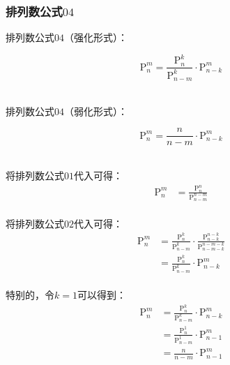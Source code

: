 \documentclass[UTF8]{ctexart}
\begin{document}
\subsubsection{排列数公式$04$}
    排列数公式$04$（强化形式）：
    \begin{large}
        \begin{equation*}
            \mathrm{P}_n^m=\frac{\mathrm{P}_n^k}{\mathrm{P}_{n-m}^k}\cdot\mathrm{P}_{n-k}^{m}
        \end{equation*}
    \end{large}\\
    排列数公式$04$（弱化形式）：
    \begin{large}
        \begin{equation*}
            \mathrm{P}_n^m=\frac{n}{n-m}\cdot\mathrm{P}_{n-k}^{m}
        \end{equation*}
    \end{large}\\
    将排列数公式$01$代入可得：
    \setcounter{equation}{0}
    \begin{align}
        \mathrm{P}_n^m&=\frac{\mathrm{P}_n^n}{\mathrm{P}_{n-m}^{n-m}}
    \end{align}\\
    将排列数公式$02$代入可得：
    \begin{align}
        \mathrm{P}_n^m
        &=\frac{\mathrm{P}_n^k}{\mathrm{P}_{n-m}^k}\cdot\frac{\mathrm{P}_{n-k}^{n-k}}{\mathrm{P}_{n-m-k}^{n-m-k}}\\[3mm]
        &=\frac{\mathrm{P}_n^k}{\mathrm{P}_{n-m}^k}\cdot\mathrm{P}_{n-k}^{m}
    \end{align}\\
    特别的，令$k=1$可以得到：
    \begin{align}
        \mathrm{P}_n^m
        &=\frac{\mathrm{P}_n^k}{\mathrm{P}_{n-m}^k}\cdot\mathrm{P}_{n-k}^{m}\\[3mm]
        &=\frac{\mathrm{P}_n^1}{\mathrm{P}_{n-m}^1}\cdot\mathrm{P}_{n-1}^{m}\\[3mm]
        &=\frac{n}{n-m}\cdot\mathrm{P}_{n-1}^{m}
    \end{align}

\newpage
\end{document}

